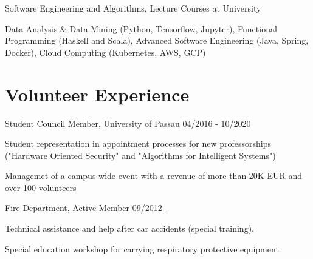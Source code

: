 \documentclass{article}
\renewenvironment{itemize}[1]{\begin{compactitem}#1}{\end{compactitem}}
\begin{document}
\ralewaysb Software Engineering and Algorithms, Lecture Courses at University \raleway 
\vspace{.5em}
\begin{itemize}[-]
  \item Data Analysis \& Data Mining (Python, Tensorflow, Jupyter), Functional Programming (Haskell and Scala), Advanced Software Engineering (Java, Spring, Docker), Cloud Computing (Kubernetes, AWS, GCP)
\end{itemize}

\vspace{.9em}

\section{Volunteer Experience}

\ralewaysb Student Council Member, \raleway University of Passau \hfill 04/2016 - 10/2020
\vspace{.5em}
\begin{itemize}[-]
  \item Student representation in appointment processes for new professorships ("Hardware Oriented Security" and "Algorithms for Intelligent Systems")
  \item Managemet of a campus-wide event with a revenue of more than 20K EUR and over 100 volunteers
\end{itemize}
\vspace{.5em}

\ralewaysb Fire Department, \raleway Active Member \hfill 09/2012 - 
\vspace{.5em}
\begin{itemize}[-]
  \item Technical assistance and help after car accidents (special training).
  \item Special education workshop for carrying respiratory protective equipment.
\end{itemize}



\end{document}
